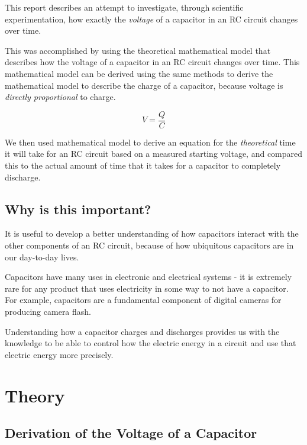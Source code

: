 \documentclass[12pt]{article}
\begin{document}
This report describes an attempt to investigate, through scientific experimentation, how exactly the \emph{voltage} of a  capacitor in an RC circuit changes over time. 

This was accomplished by using the theoretical mathematical model that describes how the voltage of a capacitor in an RC circuit changes over time. This mathematical model can be derived using the same methods to derive the mathematical model to describe the charge of a capacitor, because voltage is \emph{directly proportional} to charge.

$$ V = \frac{Q}{C} $$

We then used mathematical model to derive an equation for the \emph{theoretical} time it will take for an RC circuit based on a measured starting voltage, and compared this to the actual amount of time that it takes for a capacitor to completely discharge.



\subsection*{Why is this important?} 

It is useful to develop a better understanding of how capacitors interact with the other components of an RC circuit, because of how ubiquitous capacitors are in our day-to-day lives. 

Capacitors have many uses in electronic and electrical systems - it is extremely rare for any product that uses electricity in some way to not have a capacitor. For example, capacitors are a fundamental component of digital cameras for producing camera flash.

Understanding how a capacitor charges and discharges provides us with the knowledge to be able to control how the electric energy in a circuit and use that electric energy more precisely.


\pagebreak
{}
\section*{\centering Theory}

\subsection*{Derivation of the Voltage of a Capacitor}
\end{document}
